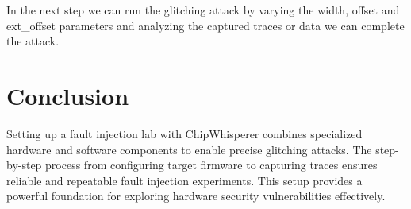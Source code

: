 In the next step we can run the glitching attack by varying the width, offset and ext\_offset parameters and analyzing the captured traces or data we can complete the attack. 

\section{Conclusion}

Setting up a fault injection lab with ChipWhisperer combines specialized hardware and software components to enable precise glitching attacks. The step-by-step process from configuring target firmware to capturing traces ensures reliable and repeatable fault injection experiments. This setup provides a powerful foundation for exploring hardware security vulnerabilities effectively.